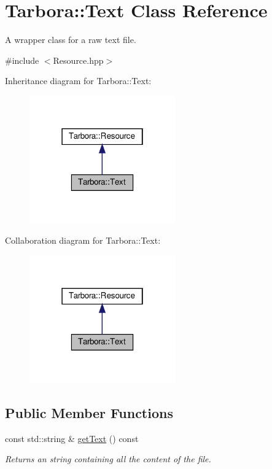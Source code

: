 \hypertarget{classTarbora_1_1Text}{}\section{Tarbora\+:\+:Text Class Reference}
\label{classTarbora_1_1Text}


A wrapper class for a raw text file.  




{\ttfamily \#include $<$Resource.\+hpp$>$}



Inheritance diagram for Tarbora\+:\+:Text\+:
\nopagebreak
\begin{figure}[H]
\begin{center}
\leavevmode
\includegraphics[width=178pt]{classTarbora_1_1Text__inherit__graph}
\end{center}
\end{figure}


Collaboration diagram for Tarbora\+:\+:Text\+:
\nopagebreak
\begin{figure}[H]
\begin{center}
\leavevmode
\includegraphics[width=178pt]{classTarbora_1_1Text__coll__graph}
\end{center}
\end{figure}
\subsection*{Public Member Functions}
\begin{DoxyCompactItemize}
\item 
\mbox{\label{classTarbora_1_1Text_a5122bf32fccb1c09dab58b3b6e102adf}} 
const std\+::string \& \hyperlink{classTarbora_1_1Text_a5122bf32fccb1c09dab58b3b6e102adf}{get\+Text} () const
\begin{DoxyCompactList}\small\item\em Returns an string containing all the content of the file. \end{DoxyCompactList}\end{DoxyCompactItemize}
